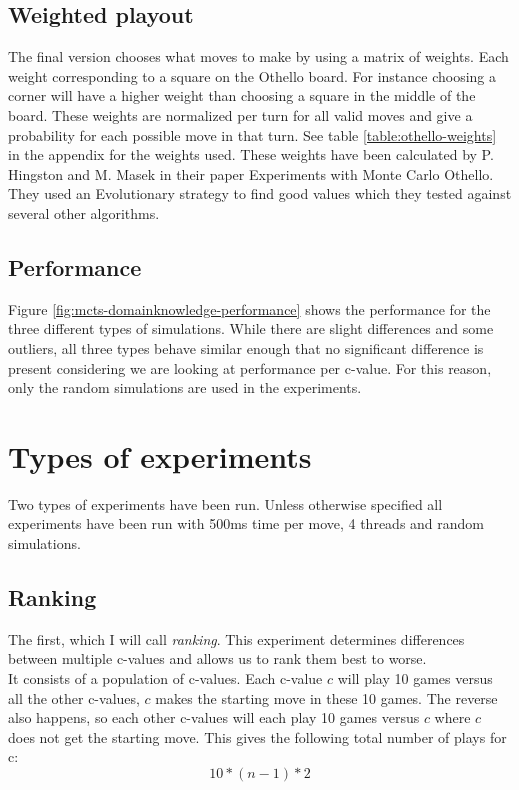 \documentclass[
11pt, %
english, %
singlespacing, %
headsepline, %
]{MastersDoctoralThesis} %
\begin{document}
\subsection{Weighted playout}
The final version chooses what moves to make by using a matrix of weights. Each weight corresponding to a square on the Othello board. For instance choosing a corner will have a higher weight than choosing a square in the middle of the board. These weights are normalized per turn for all valid moves and give a probability for each possible move in that turn. See table \ref{table:othello-weights} in the appendix for the weights used. These weights have been calculated by P. Hingston and M. Masek in their paper Experiments with Monte Carlo Othello\cite{hingston2007experiments}. They used an Evolutionary strategy to find good values which they tested against several other algorithms.

\subsection{Performance}
Figure \ref{fig:mcts-domainknowledge-performance} shows the performance for the three different types of simulations. While there are slight differences and some outliers, all three types behave similar enough that no significant difference is present considering we are looking at performance per c-value. For this reason, only the random simulations are used in the experiments.

\section{Types of experiments}
\label{section:type-experiments}
Two types of experiments have been run. Unless otherwise specified all experiments have been run with 500ms time per move, 4 threads and random simulations.

\subsection{Ranking}
\label{section:ranking}
The first, which I will call \textit{ranking}. This experiment determines differences between multiple c-values and allows us to rank them best to worse.\\

It consists of a population of c-values. Each c-value $c$ will play 10 games versus all the other c-values, $c$ makes the starting move in these 10 games. The reverse also happens, so each other c-values will each play 10 games versus $c$ where $c$ does not get the starting move. This gives the following total number of plays for c:
\[
   10 * (n-1) * 2
\]
\end{document}
